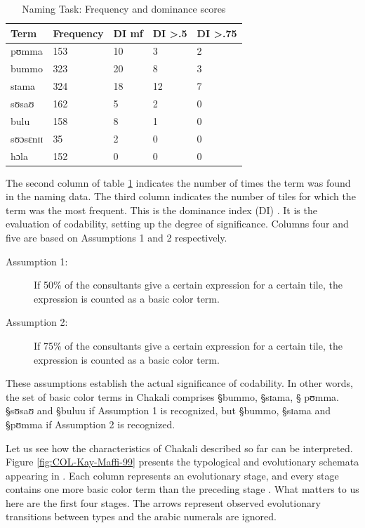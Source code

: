  \begin{table}[h]
\centering
\caption{Naming Task: Frequency and dominance scores \label{tab:freq-domscore}}
 \begin{tabular}{lllll}
\hline
Term & Frequency & DI mf & DI >.5 & DI >.75\\
\hline
{\I pʊmma} & 153 & 10 & 3  &2\\
{\I bummo} & 323 & 20 & 8 & 3\\
{\I sɪama} & 324 & 18 &12&7\\
{\I sʊsaʊ} & 162 & 5 &2&0\\
{\I bulu} & 158 & 8 &1&0\\
{\I sʊɔsɛnɪɪ} & 35 & 2 &0&0\\
{\I *hɔla} & 152  & 0 &0&0\\
\hline
 \end{tabular} 

\end{table} 


The second column of table \ref{tab:freq-domscore} indicates the number of times
the term was found in the naming data. The third column indicates the number of
tiles for which the term was  the most frequent. This is the dominance
index (DI)
\cite[35]{Davi95}. It is
the evaluation of codability, setting up the degree of significance. Columns
four and five are based on Assumptions 1 and 2 respectively.  


 \begin{description}
 \item[Assumption 1:] If 50\% of the consultants give a
certain expression for a certain tile, the expression is counted as  a 
basic
color term. 

 \item[Assumption 2:] If 75\% of the consultants give a
certain expression for a certain tile, the expression is counted as a  basic
color term. 
 \end{description}


These assumptions establish the actual significance of codability. In other
words,
the set of basic color terms in Chakali comprises {\S bummo}, {\S sɪama},  {\S
pʊmma}.
{\S sʊsaʊ} and  {\S buluu} if Assumption 1  is
recognized, but {\S bummo}, {\S sɪama} and   {\S pʊmma} if Assumption 2  is
recognized. 

Let us see how  the characteristics of Chakali described so
far can be interpreted. Figure \ref{fig:COL-Kay-Maffi-99} presents the 
typological and
evolutionary schemata appearing  in \citet[33]{Kay97}.  Each column represents
an evolutionary stage, and every stage contains one more basic color term than
the preceding stage \citep[10]{Kay99}. What matters to us here are the first
four stages. The arrows represent observed evolutionary transitions
between types and  the arabic numerals are ignored. 


